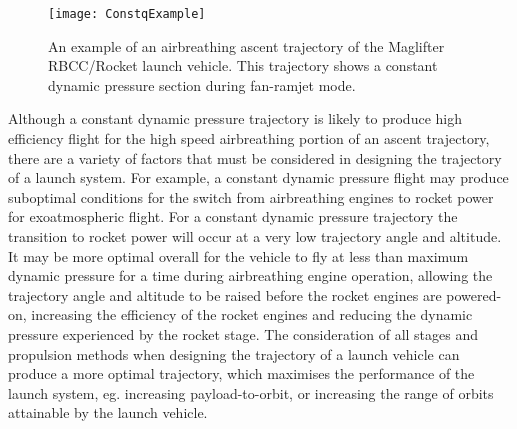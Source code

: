 \begin{figure}[ht]
	\centering
	\texttt{[image: ConstqExample]}
	\caption{An example of an airbreathing ascent trajectory of the Maglifter RBCC/Rocket launch vehicle\cite{Olds1998}. This trajectory shows a constant dynamic pressure section during fan-ramjet mode\cite{Olds1998}.}
	\label{fig:constqexample}
\end{figure}
Although a constant dynamic pressure trajectory is likely to produce high efficiency flight for the high speed airbreathing portion of an ascent trajectory, there are a variety of factors that must be considered in designing the trajectory of a launch system. 
For example, a constant dynamic pressure flight may produce suboptimal conditions for the switch from airbreathing engines to rocket power for exoatmospheric flight. 
 For a constant dynamic pressure trajectory the transition to rocket power will occur at a very low trajectory angle and altitude\cite{Preller2017}. 
 It may be more optimal overall for the vehicle to fly at less than maximum dynamic pressure for a time during airbreathing engine operation, allowing the trajectory angle and altitude to be raised before the rocket engines are powered-on, increasing the efficiency of the rocket engines and reducing the dynamic pressure experienced by the rocket stage\cite{Tsuchiya2005,Wilhite1991,Mehta2001}.
 The consideration of all stages and propulsion methods when designing the trajectory of a launch vehicle can produce a more optimal trajectory, which maximises the performance of the launch system, eg. increasing payload-to-orbit, or increasing the range of orbits attainable by the launch vehicle.

